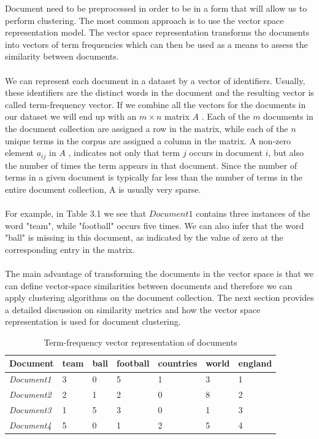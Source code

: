 Document need to be preprocessed in order to be in a form that will allow us to perform clustering. 
The most common approach is to use the vector space representation model. The vector space representation transforms the 
documents into vectors of term frequencies which can then be used as a means to assess the similarity between documents.\\\\
We can represent each document in a dataset by a vector of identifiers. Usually, these identifiers are the distinct words in the document and 
the resulting vector is called term-frequency vector. If we combine all the vectors for the documents in our dataset we will end up with an 
\boldmath $m \times n$  \unboldmath  matrix \boldmath $A$ \unboldmath. Each of the $m$ documents in the document collection are assigned a row 
in the matrix, while each of the $n$ unique terms in the corpus are assigned a column in the matrix. A non-zero element $a_{ij}$ in \boldmath 
$A$ \unboldmath, indicates not only that term $j$ occurs in document $i$, but also the number of times the term appears in that document. Since the number of terms in a given 
document is typically far less than the number of terms in the entire document collection, A is usually very sparse.\\\\
For example, in Table 3.1 we see that $Document1$ contains three instances of the word "team", while "football" occurs five times. We can also infer that
the word "ball" is missing in this document, as indicated by the value of zero at the corresponding entry in the matrix.\\\\ 
The main advantage of transforming the documents in the vector space is that we can define vector-space similarities between documents and therefore
we can apply clustering algorithms on the document collection. The next section provides a detailed discussion on similarity metrics and how the vector space 
representation is used for document clustering.

\begin{table}[tbp]
\centering
\begin{tabular}{ l  l  l  l  l  l  l }
  \hline
  \textbf{Document} & \textbf{team} & \textbf{ball} & \textbf{football} & \textbf{countries} & \textbf{world} & \textbf{england} \\ \hline
  \emph{Document1} & 3 & 0 & 5 & 1 & 3 & 1 \\
  \emph{Document2} & 2 & 1 & 2 & 0 & 8 & 2\\
  \emph{Document3} & 1 & 5 & 3 & 0 & 1 & 3\\
  \emph{Document4} & 5 & 0 & 1 & 2 & 5 & 4\\
  \hline
\end{tabular}
\caption{Term-frequency vector representation of documents}
\label{termfrequencyTable}
\end{table}

